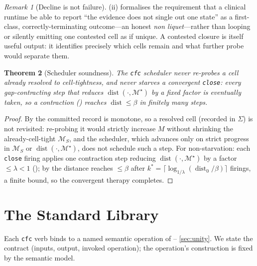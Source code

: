 \documentclass[11pt,a4paper]{article}
\theoremstyle{cfcthm}
\newtheorem{theorem}{Theorem}[section]
\theoremstyle{definition}
\theoremstyle{remark}
\newtheorem{remark}[theorem]{Remark}
\newcommand{\Man}{\mathcal{M}}          %
\newcommand{\Coh}{\Man^{\star}}         %
\newcommand{\flo}{\beta}                %
\newcommand{\rec}{M}                    %
\newcommand{\dist}{\operatorname{dist}}
\newcommand{\cf}[1]{\texttt{#1}}
\begin{document}
\begin{remark}[Decline is not failure]
\label{rem:decline-not-failure}
(ii) formalises the requirement that a clinical runtime be
able to report ``the evidence does not single out one state'' as a first-class,
correctly-terminating outcome---an honest \emph{non liquet}---rather than
looping or silently emitting one contested cell as if unique. A contested
closure is itself useful output: it identifies precisely which cells remain and
what further probe would separate them.
\end{remark}

\begin{theorem}[Scheduler soundness]
\label{thm:scheduler}
The \cf{cfc} scheduler never re-probes a cell already resolved to
cell-tightness, and never starves a convergent \cf{close}: every
gap-contracting step that reduces $\dist(\cdot,\Coh)$ by a fixed factor is
eventually taken, so a contraction () reaches
$\dist\le\flo$ in finitely many steps.
\end{theorem}

\begin{proof}
By  the committed record is monotone, so a resolved cell
(recorded in $\Sigma$) is not revisited: re-probing it would strictly increase
$\rec$ without shrinking the already-cell-tight $\Man_S$, and the scheduler,
which advances only on strict progress in $\Man_S$ or $\dist(\cdot,\Coh)$, does
not schedule such a step. For non-starvation: each \cf{close} firing applies one
contraction step reducing $\dist(\cdot,\Coh)$ by a factor $\le\lambda<1$
(); by  the distance reaches
$\le\flo$ after $k^{\ast}=\lceil\log_{1/\lambda}(\dist_0/\flo)\rceil$ firings,
a finite bound, so the convergent therapy completes.
\end{proof}

\section{The Standard Library}
\label{sec:stdlib}

Each \cf{cfc} verb binds to a named semantic operation of --%
\ref{sec:unity}. We state the contract (inputs, output, invoked operation); the
operation's construction is fixed by the semantic model.
\end{document}
